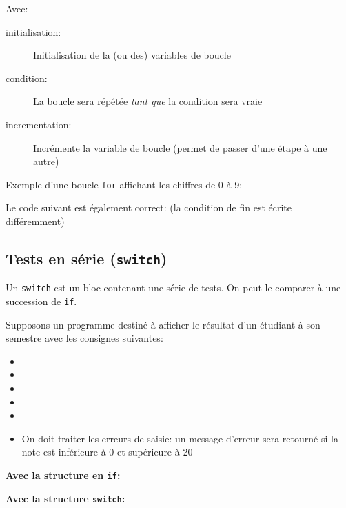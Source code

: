 				Avec:
				\begin{description}
					\item[initialisation:] Initialisation de la (ou des) variables de boucle
					\item[condition:] La boucle sera répétée \emph{tant que} la condition sera vraie
					\item[incrementation:] Incrémente la variable de boucle (permet de passer \og d'une étape à une autre\fg{})
				\end{description}
			
				\begin{exemple}
					Exemple d'une boucle \lstinline|for| affichant les chiffres de \num{0} à \num{9}:
					
				\end{exemple}
			
				\begin{remarque}
					Le code suivant est également correct: (la condition de fin est écrite différemment)
					
				\end{remarque}
			
			\subsection{Tests en série (\lstinline|switch|)}
			
				Un \lstinline|switch| est un bloc contenant une série de tests. On peut le comparer à une succession de \lstinline|if|.
				
				\begin{exemple}
					Supposons un programme destiné à afficher le résultat d'un étudiant à son semestre avec les consignes suivantes:
					\begin{itemize}
						\item {}
						\item {}
						\item {}
						\item {}
						\item {}
						\item On doit traiter les erreurs de saisie: un message d'erreur sera retourné si la note est inférieure à \num{0} et supérieure à \num{20}
					\end{itemize}
					\begin{center}
							\textbf{Avec la structure en \lstinline|if|:}
					\end{center}
					
										
					\begin{center}
						\textbf{Avec la structure \lstinline|switch|:}
					\end{center}
					
				\end{exemple}
			
